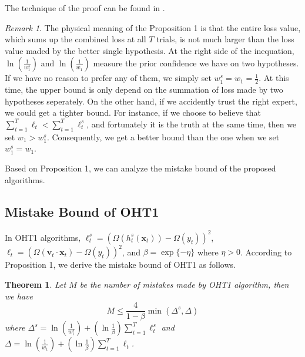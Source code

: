 \documentclass{article} %
\newtheorem{thm}{Theorem}
\theoremstyle{remark}
\newtheorem*{rem}{Remark}
\theoremstyle{definition}
\begin{document}
The technique of the proof can be found in \cite{freund1995decision}.
\begin{rem}
The physical meaning of the Proposition 1 is that the entire loss value, which sums up the combined loss at all $T$ trials, is not much larger than the loss value maded by the better single hypothesis.
At the right side of the inequation, $\ln(\frac{1}{w_{1}^{s}})$ and $\ln(\frac{1}{w_1})$ measure the prior confidence we have on two hypotheses.
If we have no reason to prefer any of them, we simply set $w_{1}^{s} = w_1 = \frac{1}{2}$.
At this time, the upper bound is only depend on the summation of loss made by two hypotheses seperately.
On the other hand, if we accidently trust the right expert, we could get a tighter bound.
For instance, if we choose to believe that $\sum\limits_{t=1}^{T} \ell_{t} < \sum\limits_{t=1}^{T} \ell_{t}^{s}$, and fortunately it is the truth at the same time, then we set $w_1 > w_{1}^{s}$.
Consequently, we get a better bound than the one when we set $w_{1}^{s} = w_{1}$.

Based on Proposition 1, we can analyze the mistake bound of the proposed algorithms.

\end{rem}

\subsection{Mistake Bound of OHT1}

In OHT1 algorithms, $\ell_{t}^{s} = (\varOmega(h_{t}^{s}(\mathbf{x}_t)) - \varOmega(y_t)) ^ 2$, $\ell_t = (\varOmega(\mathbf{v}_t \cdot \mathbf{x}_t) - \varOmega(y_t)) ^ 2$, and $\beta = \exp\{-\eta\}$ where $\eta > 0$.
According to Proposition 1, we derive the mistake bound of OHT1 as follows.

\begin{thm}
Let $M$ be the number of mistakes made by OHT1 algorithm, then we have 
$$ M \leq \frac{4}{1-\beta} \min (\varDelta^s, \varDelta) $$
where
$ \varDelta^s = \ln(\frac{1}{w_{1}^{s}}) + (\ln \frac{1}{\beta}) \sum\limits_{t=1}^{T} \ell_{t}^{s} $ and $ \varDelta = \ln(\frac{1}{w_{1}}) + (\ln \frac{1}{\beta}) \sum\limits_{t=1}^{T} \ell_{t} $.
\end{thm}
\end{document}
